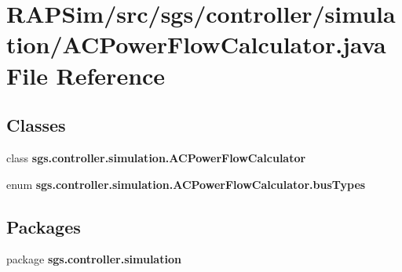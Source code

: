 \section{R\-A\-P\-Sim/src/sgs/controller/simulation/\-A\-C\-Power\-Flow\-Calculator.java File Reference}
\label{_a_c_power_flow_calculator_8java}
\subsection*{Classes}
\begin{DoxyCompactItemize}
\item 
class {\bf sgs.\-controller.\-simulation.\-A\-C\-Power\-Flow\-Calculator}
\item 
enum {\bf sgs.\-controller.\-simulation.\-A\-C\-Power\-Flow\-Calculator.\-bus\-Types}
\end{DoxyCompactItemize}
\subsection*{Packages}
\begin{DoxyCompactItemize}
\item 
package {\bf sgs.\-controller.\-simulation}
\end{DoxyCompactItemize}
